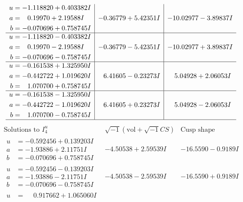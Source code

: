 \documentclass[1p]{elsarticle_modified}
\theoremstyle{definition}
\newcommand{\I}{\sqrt{-1}}
\begin{document}
$$\begin{array}{c|c|c}
\begin{aligned}
u &= -1.118820 + 0.403382 I \\
a &= \phantom{-}0.19970 + 2.19588 I \\
b &= -0.070696 + 0.758745 I\end{aligned}
 & -0.36779 + 5.42351 I & -10.02977 - 3.89837 I \\ \hline\begin{aligned}
u &= -1.118820 - 0.403382 I \\
a &= \phantom{-}0.19970 - 2.19588 I \\
b &= -0.070696 - 0.758745 I\end{aligned}
 & -0.36779 - 5.42351 I & -10.02977 + 3.89837 I \\ \hline\begin{aligned}
u &= -0.161538 + 1.325950 I \\
a &= -0.442722 + 1.019620 I \\
b &= \phantom{-}1.070700 + 0.758745 I\end{aligned}
 & \phantom{-}6.41605 - 0.23273 I & \phantom{-}5.04928 + 2.06053 I \\ \hline\begin{aligned}
u &= -0.161538 - 1.325950 I \\
a &= -0.442722 - 1.019620 I \\
b &= \phantom{-}1.070700 - 0.758745 I\end{aligned}
 & \phantom{-}6.41605 + 0.23273 I & \phantom{-}5.04928 - 2.06053 I\\
 \hline 
 \end{array}$$\newpage$$\begin{array}{c|c|c}  
\text{Solutions to }I^u_{4}& \I (\text{vol} + \sqrt{-1}CS) & \text{Cusp shape}\\
 \hline 
\begin{aligned}
u &= -0.592456 + 0.139203 I \\
a &= -1.93886 + 2.11751 I \\
b &= -0.070696 + 0.758745 I\end{aligned}
 & -4.50538 + 2.59539 I & -16.5590 - 0.9189 I \\ \hline\begin{aligned}
u &= -0.592456 - 0.139203 I \\
a &= -1.93886 - 2.11751 I \\
b &= -0.070696 - 0.758745 I\end{aligned}
 & -4.50538 - 2.59539 I & -16.5590 + 0.9189 I \\ \hline\begin{aligned}
u &= \phantom{-}0.917662 + 1.065060 I \\

\end{aligned}
\end{array}$$
\end{document}
